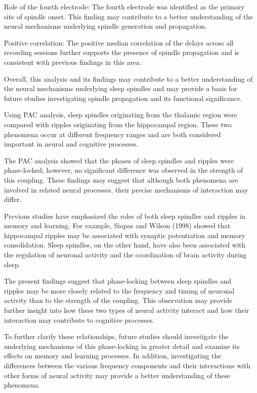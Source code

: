 \documentclass[12pt]{report}
\begin{document}
Role of the fourth electrode: The fourth electrode was identified as the primary site of spindle onset. This finding may contribute to a better understanding of the neural mechanisms underlying spindle generation and propagation.

Positive correlation: The positive median correlation of the delays across all recording sessions further supports the presence of spindle propagation and is consistent with previous findings in this area.

Overall, this analysis and its findings may contribute to a better understanding of the neural mechanisms underlying sleep spindles and may provide a basis for future studies investigating spindle propagation and its functional significance.

Using PAC analysis, sleep spindles originating from the thalamic region were compared with ripples originating from the hippocampal region. These two phenomena occur at different frequency ranges and are both considered important in neural and cognitive processes.

The PAC analysis showed that the phases of sleep spindles and ripples were phase-locked; however, no significant difference was observed in the strength of this coupling. These findings may suggest that although both phenomena are involved in related neural processes, their precise mechanisms of interaction may differ.

Previous studies have emphasized the roles of both sleep spindles and ripples in memory and learning. For example, Siapas and Wilson (1998) showed that hippocampal ripples may be associated with synaptic potentiation and memory consolidation. Sleep spindles, on the other hand, have also been associated with the regulation of neuronal activity and the coordination of brain activity during sleep.

The present findings suggest that phase-locking between sleep spindles and ripples may be more closely related to the frequency and timing of neuronal activity than to the strength of the coupling. This observation may provide further insight into how these two types of neural activity interact and how their interaction may contribute to cognitive processes.

To further clarify these relationships, future studies should investigate the underlying mechanisms of this phase-locking in greater detail and examine its effects on memory and learning processes. In addition, investigating the differences between the various frequency components and their interactions with other forms of neural activity may provide a better understanding of these phenomena.
\end{document}

